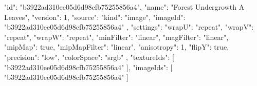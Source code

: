 {
  "id": "b3922ad310ee05d6d98cfb75255856a4",
  "name": "Forest Undergrowth A Leaves",
  "version": 1,
  "source": {
    "kind": "image",
    "imageId": "b3922ad310ee05d6d98cfb75255856a4"
  },
  "settings": {
    "wrapU": "repeat",
    "wrapV": "repeat",
    "wrapW": "repeat",
    "minFilter": "linear",
    "magFilter": "linear",
    "mipMap": true,
    "mipMapFilter": "linear",
    "anisotropy": 1,
    "flipY": true,
    "precision": "low",
    "colorSpace": "srgb"
  },
  "textureIds": [
    "b3922ad310ee05d6d98cfb75255856a4"
  ],
  "imageIds": [
    "b3922ad310ee05d6d98cfb75255856a4"
  ]
}
